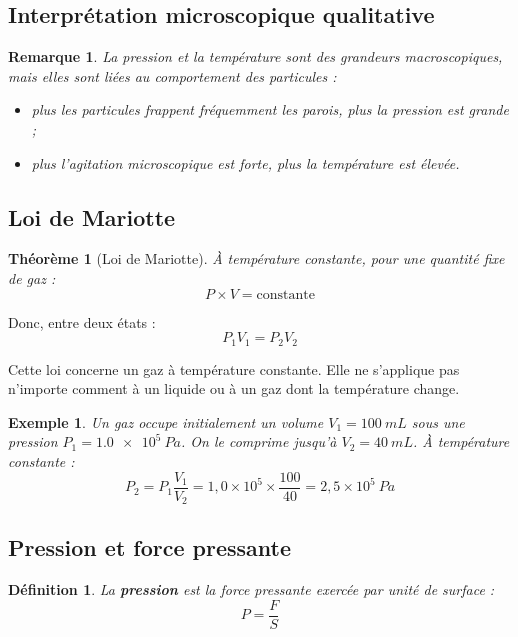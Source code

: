 \documentclass[11pt,a4paper]{article}
\newtheorem{definition}{Définition}[section]
\newtheorem{theoreme}{Théorème}[section]
\newtheorem{remarque}{Remarque}[section]
\newtheorem{exemple}{Exemple}[section]
\begin{document}
\subsection{Interprétation microscopique qualitative}

\begin{remarque}
La pression et la température sont des grandeurs macroscopiques, mais elles sont liées au comportement des particules :

\begin{itemize}
    \item plus les particules frappent fréquemment les parois, plus la pression est grande ;
    \item plus l'agitation microscopique est forte, plus la température est élevée.
\end{itemize}
\end{remarque}

\subsection{Loi de Mariotte}

\begin{theoreme}[Loi de Mariotte]
À température constante, pour une quantité fixe de gaz :
\[
P\times V = \text{constante}
\]
\end{theoreme}

Donc, entre deux états :
\[
P_1V_1=P_2V_2
\]

\begin{attentionbox}
Cette loi concerne un gaz à température constante.  
Elle ne s'applique pas n'importe comment à un liquide ou à un gaz dont la température change.
\end{attentionbox}

\begin{exemple}
Un gaz occupe initialement un volume $V_1=\SI{100}{mL}$ sous une pression $P_1=\SI{1,0e5}{Pa}$.  
On le comprime jusqu'à $V_2=\SI{40}{mL}$. À température constante :
\[
P_2=P_1\frac{V_1}{V_2}
=1,0\times 10^5\times \frac{100}{40}
=2,5\times 10^5\ \si{Pa}
\]
\end{exemple}

\subsection{Pression et force pressante}

\begin{definition}
La \textbf{pression} est la force pressante exercée par unité de surface :
\[
P=\frac{F}{S}
\]
\end{definition}
\end{document}
